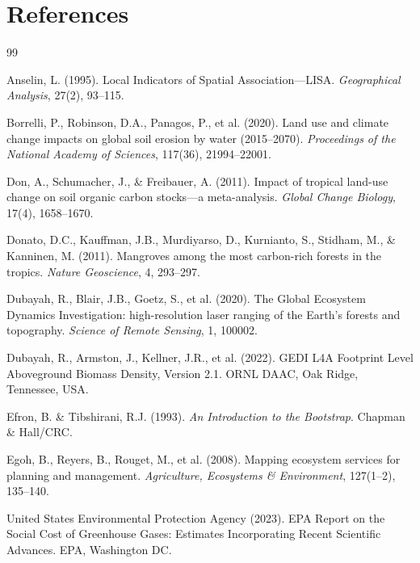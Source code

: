 \documentclass[12pt,a4paper]{article}
\begin{document}
\section{References}
\renewcommand{\refname}{}      %
\vspace{-2.2em}
\begin{thebibliography}{99}
\setlength{\itemsep}{2pt}

Anselin, L. (1995).
Local Indicators of Spatial Association---LISA.
\textit{Geographical Analysis}, 27(2), 93--115.

Borrelli, P., Robinson, D.A., Panagos, P., et al. (2020).
Land use and climate change impacts on global soil erosion by water
(2015--2070).
\textit{Proceedings of the National Academy of Sciences}, 117(36),
21994--22001.

Don, A., Schumacher, J., \& Freibauer, A. (2011).
Impact of tropical land-use change on soil organic carbon stocks---a
meta-analysis.
\textit{Global Change Biology}, 17(4), 1658--1670.

Donato, D.C., Kauffman, J.B., Murdiyarso, D., Kurnianto, S.,
Stidham, M., \& Kanninen, M. (2011).
Mangroves among the most carbon-rich forests in the tropics.
\textit{Nature Geoscience}, 4, 293--297.

Dubayah, R., Blair, J.B., Goetz, S., et al. (2020).
The Global Ecosystem Dynamics Investigation: high-resolution laser
ranging of the Earth's forests and topography.
\textit{Science of Remote Sensing}, 1, 100002.

Dubayah, R., Armston, J., Kellner, J.R., et al. (2022).
GEDI L4A Footprint Level Aboveground Biomass Density, Version 2.1.
ORNL DAAC, Oak Ridge, Tennessee, USA.

Efron, B. \& Tibshirani, R.J. (1993).
\textit{An Introduction to the Bootstrap}.
Chapman \& Hall/CRC.

Egoh, B., Reyers, B., Rouget, M., et al. (2008).
Mapping ecosystem services for planning and management.
\textit{Agriculture, Ecosystems \& Environment}, 127(1--2), 135--140.

United States Environmental Protection Agency (2023).
EPA Report on the Social Cost of Greenhouse Gases: Estimates
Incorporating Recent Scientific Advances. EPA, Washington DC.


\end{thebibliography}
\end{document}

